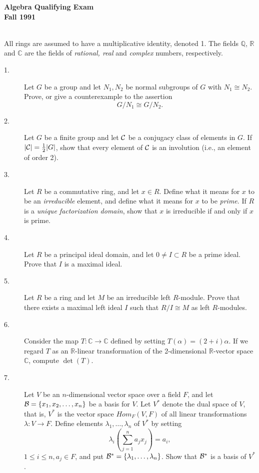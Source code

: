 \documentclass{article}
\def\R{\mathbb R}
\def\C{\mathbb C}
\def\Q{\mathbb Q}
\begin{document}


\begin{center}\begin{LARGE}
{\bf Algebra Qualifying Exam}\\ 
{\bf Fall 1991}\\ \end{LARGE}
\end{center}
\vspace{0.1in}
\noindent\hrulefill\\

All rings are assumed to have a multiplicative identity, denoted 1. The
fields $\Q$, $\R$ and $\C$ are the fields of {\it rational, real} and
{\it complex} numbers, respectively.


\begin{description}

\item[1.]
Let $G$ be a group and let $N_1, N_2$ be normal subgroups of $G$ with
$N_1 \cong N_2$. Prove, or give a counterexample to the assertion
$$G/N_1 \cong G/N_2.$$

\item[2.]
Let $G$ be a finite group and let $\cal C$ be a conjugacy class of elements
in $G$. If $|{\cal C}| = \frac{1}{2} |G|$, show that every element of
$\cal C$ is an involution (i.e., an element of order 2).

\item[3.]
Let $R$ be a commutative ring, and let $x \in R$. Define what it means
for $x$ to be an {\it irreducible} element, and define what it means for
$x$ to be {\it prime}. If $R$ is a {\it unique factorization domain},
show that $x$ is irreducible if and only if $x$ is prime.

\item[4.]
Let $R$ be a principal ideal domain, and let $0 \neq I \subset R$ be a prime
ideal. Prove that $I$ is a maximal ideal.

\item[5.]
Let $R$ be a ring and let $M$ be an irreducible left $R$-module. Prove
that there exists a maximal left ideal $I$ such that $R/I \cong M$
as left $R$-modules.

\item[6.]
Consider the map $T: \C \to \C$ defined by setting $T(\alpha) = (2+i) \alpha$.
If we regard $T$ as an $\R$-linear transformation of the 2-dimensional
$\R$-vector space $\C$, compute $\det(T)$.

\item[7.]
Let $V$ be an $n$-dimensional vector space over a field $F$, and let
${\cal B} = \{x_1, x_2, \dots, x_n\}$ be a basis for $V$. Let $V^\ast$
denote the dual space of $V$, that is, $V^\ast$ is the vector space
$Hom_F(V,F)$ of all linear transformations $\lambda : V \to F$.
Define elements $\lambda_1, \dots, \lambda_n$ of $V^\ast$ by setting
$$\lambda_i \left( \sum^n_{j=1} a_jx_j \right) = a_i,$$
$1 \leq i \leq n, a_j \in F$, and put
${\cal B}^\ast = \{\lambda_1, \dots, \lambda_n\}$. Show that ${\cal B}^\ast$
is a basis of $V^\ast$.


\end{description}
\end{document}
